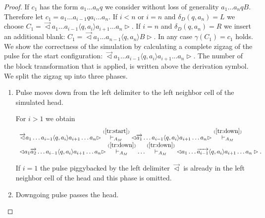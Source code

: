 \documentclass[pre,showpacs,showkeys,preprint]{revtex4}
\theoremstyle{definition}
\begin{document}
\begin{proof}
If $c_1$ has the form $a_1 \ldots a_n q$ we consider without loss of generality $a_1 \ldots a_n q B$.
Therefore let $c_1 = a_1 \ldots a_{i-1} q a_i \ldots a_n$.
If $i < n$ or $i = n$ and $\delta_D(q, a_n) = L$ we choose
 $C_1 = \overrightarrow{\lhd}  a_1 \ldots a_{i-1} \langle q,a_i \rangle a_{i+1} \ldots a_n \rhd$.
 If $i = n$ and $\delta_D(q, a_n) = R$ we insert an additional blank:
 $C_1 = \overrightarrow{\lhd}  a_1 \ldots a_{n-1} \langle q,a_n \rangle  B \rhd$.
 In any case $\gamma(C_1)=c_1$ holds.
We show the correctness of the simulation by calculating a complete zigzag of the pulse for the
start configuration:
$\overrightarrow{\lhd}  a_1 \ldots a_{i-1} \langle q,a_i \rangle a_{i+1} \ldots a_n \rhd$.
The number of the block transformation that is applied, is written above the derivation symbol.
We split the zigzag up into three phases.

\begin{enumerate}
\item Pulse moves down from the left delimiter to the left neighbor cell of the simulated head.

For $i > 1$ we obtain
\begin{equation}
\begin{array}{l}
\overrightarrow{\lhd}  a_1 \ldots a_{i-1} \langle q,a_i \rangle a_{i+1} \ldots a_n \rhd
\stackrel{(\ref{tr:start})}{\vdash_{A_M}}
\lhd  \overrightarrow{a_1} \ldots a_{i-1} \langle q,a_i \rangle a_{i+1} \ldots a_n \rhd
\stackrel{(\ref{tr:down})}{\vdash_{A_M}} \\
\lhd  a_1 \overrightarrow{a_2} \ldots a_{i-1} \langle q,a_i \rangle a_{i+1} \ldots a_n \rhd
\stackrel{(\ref{tr:down})}{\vdash_{A_M}} \ldots \stackrel{(\ref{tr:down})}{\vdash_{A_M}}
\lhd  a_1 \ldots \overrightarrow{a_{i-1}} \langle q,a_i \rangle a_{i+1} \ldots a_n \rhd.
\label{der:start}
\end{array}
\end{equation}

If $i = 1$ the pulse piggybacked by the left delimiter $\overrightarrow{\lhd}$ is already
in the left neighbor cell of the head and this phase is omitted.

\item Downgoing pulse passes the head.


\end{enumerate}
\end{proof}
\end{document}
